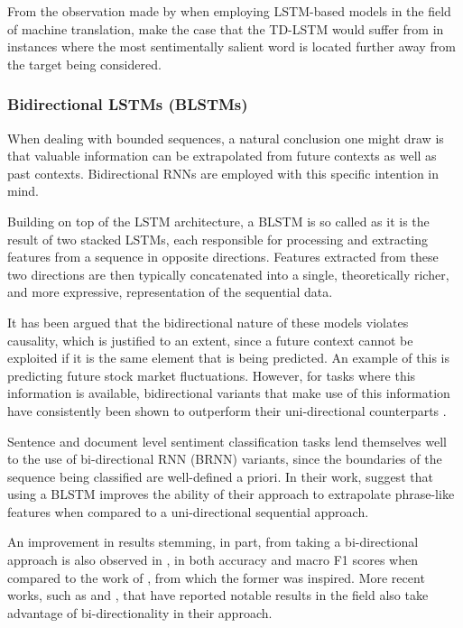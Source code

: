 \documentclass[../../fyp.tex]{subfiles}
\begin{document}
From the observation made by \citet{bahdanau2014} when employing LSTM-based models in the field of machine translation, \citet{chen2017} make the case that the TD-LSTM would suffer from in instances where the most sentimentally salient word is located further away from the target being considered.

\subsubsection{Bidirectional LSTMs (BLSTMs)}
When dealing with bounded sequences, a natural conclusion one  might draw is that valuable information can be extrapolated from future contexts as well as past contexts. Bidirectional RNNs are employed with this specific intention in mind.

Building on top of the LSTM architecture, a BLSTM is so called as it is the result of two stacked LSTMs, each responsible for processing and extracting features from a sequence in opposite directions. Features extracted from these two directions are then typically concatenated into a single, theoretically richer, and more expressive, representation of the sequential data.

It has been argued that the bidirectional nature of these models violates causality, which is justified to an extent, since a future context cannot be exploited if it is the same element that is being predicted. An example of this is predicting future stock market fluctuations. However, for tasks where this information is available, bidirectional variants that make use of this information have consistently been shown to outperform their uni-directional counterparts \cite{graves2012b}.

Sentence and document level sentiment classification tasks lend themselves well to the use of bi-directional RNN (BRNN) variants, since the boundaries of the sequence being classified are well-defined a priori. In their work, \citet{chen2017} suggest that using a BLSTM improves the ability of their approach to extrapolate phrase-like features when compared to a uni-directional sequential approach.

An improvement in results stemming, in part, from taking a bi-directional approach is also observed in \cite{zhang2016}, in both accuracy and macro F1 scores when compared to the work of \cite{vo2015}, from which the former was inspired. More recent works, such as \citet{ma2018} and \citet{zheng2018}, that have reported notable results in the field also take advantage of bi-directionality in their approach.
\end{document}
